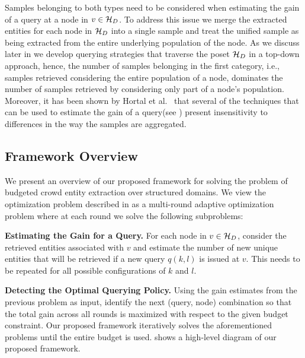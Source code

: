 Samples belonging to both types need to be considered when estimating the gain of a query at a node in $v \in \mathcal{H}_D$. To address this issue we merge the extracted entities for each node in $\mathcal{H}_D$ into a single sample and treat the unified sample as being extracted from the entire underlying population of the node. As we discuss later in  we develop querying strategies that traverse the poset $\mathcal{H}_D$ in a top-down approach, hence, the number of samples belonging in the first category, i.e., samples retrieved considering the entire population of a node, dominates the number of samples retrieved by considering only part of a node's population. Moreover, it has been shown by Hortal et al.~\cite{hortal2006evaluating} that several of the techniques that can be used to estimate the gain of a query(see ) present insensitivity to differences in the way the samples are aggregated.

\subsection{Framework Overview}
\label{sec:framework}
We present an overview of our proposed framework for solving the problem of budgeted crowd entity extraction over structured domains. We view the optimization problem described in  as a multi-round adaptive optimization problem where at each round we solve the following subproblems: 
\squishlist 
\item \textbf{Estimating the Gain for a Query.} For each node in $v \in \mathcal{H}_D$, consider the retrieved entities associated with $v$ and estimate the number of new unique entities that will be retrieved if a new query $q(k,l)$ is issued at $v$. This needs to be repeated for all possible configurations of $k$ and $l$.
\item \textbf{Detecting the Optimal Querying Policy.} Using the gain estimates from the previous problem as input, identify the next (query, node) combination so that the total gain across all rounds is maximized with respect to the given budget constraint. 
\squishend
Our proposed framework iteratively solves the aforementioned problems until the entire budget is used.  shows a high-level diagram of our proposed framework. 

